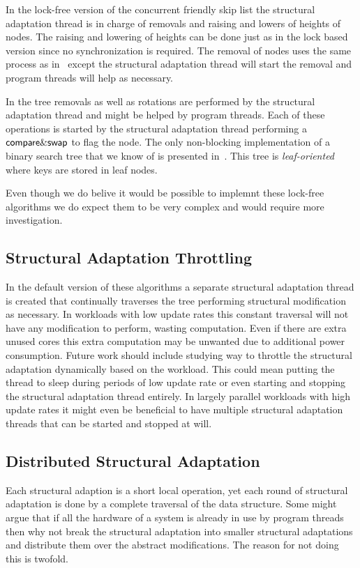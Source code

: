 In the lock-free version of the concurrent friendly skip list the structural adaptation thread is in charge of removals and
raising and lowers of heights of nodes.
The raising and lowering of heights can be done just as in the lock based version since no synchronization is required.
The removal of nodes uses the same process as in~\cite{Fra03} except the structural adaptation thread will start the removal and
program threads will help as necessary.

In the tree removals as well as rotations are performed by the structural adaptation thread and might be helped by
program threads.
Each of these operations is started by the structural adaptation thread performing a 
$\lit{compare\&swap}$ to flag the node.
The only non-blocking implementation of a binary search tree that we know of is presented in~\cite{EFRB10}.
This tree is \emph{leaf-oriented} where keys are stored in leaf nodes.

Even though we do belive it would be possible to implemnt these lock-free algorithms we do expect them to be very complex
and would require more investigation.

\subsection{Structural Adaptation Throttling}
In the default version of these algorithms a separate structural adaptation thread is created that continually
traverses the tree performing structural modification as necessary.
In workloads with low update rates this constant traversal will not have any modification to perform,
wasting computation.
Even if there are extra unused cores this extra computation may be unwanted due to additional power
consumption.
Future work should include studying way to throttle the structural adaptation dynamically based on the workload.
This could mean putting the thread to sleep during periods of low update rate or even starting
and stopping the structural adaptation thread entirely.
In largely parallel workloads with high update rates it might even be beneficial
to have multiple structural adaptation threads that can be started and stopped at will.

\subsection{Distributed Structural Adaptation}\label{sec:disMaint}
Each structural adaption is a short local operation, yet each round of structural adaptation is done by a complete traversal
of the data structure.
Some might argue that if all the hardware of a system is already in use by program threads then why not break the structural adaptation
into smaller structural adaptations and distribute them over the abstract modifications.
The reason for not doing this is twofold.

